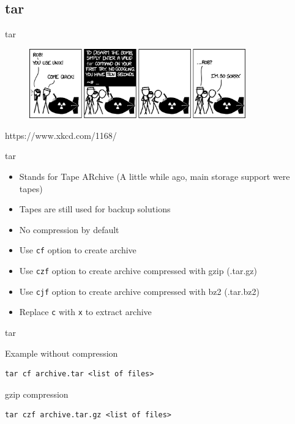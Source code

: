 \subsection{tar}

\begin{frame}[fragile]{tar}
  \begin{figure}[!h]
    \includegraphics[height=3cm]{img/tar_2x.png}
  \end{figure}
  https://www.xkcd.com/1168/
\end{frame}

\begin{frame}[fragile]{tar}
  \begin{itemize}
    \pause \item Stands for Tape ARchive (A little while ago, main storage support were tapes)
    \pause \item Tapes are still used for backup solutions
    \pause \item No compression by default
    \pause \item Use \texttt{cf} option to create archive
    \pause \item Use \texttt{czf} option to create archive compressed with gzip (.tar.gz)
    \pause \item Use \texttt{cjf} option to create archive compressed with bz2 (.tar.bz2)
    \pause \item Replace \texttt{c} with \texttt{x} to extract archive
  \end{itemize}
\end{frame}

\begin{frame}[fragile]{tar}
  \begin{exampleblock}{Example without compression}
    \begin{lstlisting}[showstringspaces=false]
tar cf archive.tar <list of files>
    \end{lstlisting}
  \end{exampleblock}
  \pause

  \begin{exampleblock}{gzip compression}
    \begin{lstlisting}[showstringspaces=false]
tar czf archive.tar.gz <list of files>
    \end{lstlisting}
  \end{exampleblock}
\end{frame}
